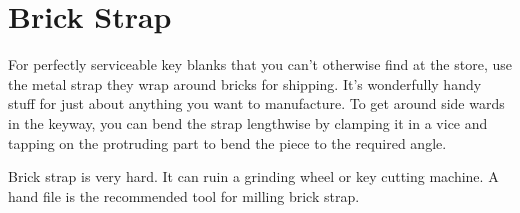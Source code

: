 \section{Brick Strap}
For perfectly serviceable key blanks that you can't otherwise find at the store, use the metal 
strap they wrap around bricks for shipping. It's wonderfully handy stuff for just about 
anything you want to manufacture. To get around side wards in the keyway, you can bend 
the strap lengthwise by clamping it in a vice and tapping on the protruding part to bend 
the piece to the required angle. 

Brick strap is very hard. It can ruin a grinding wheel or key cutting machine. A hand 
file is the recommended tool for milling brick strap. 
